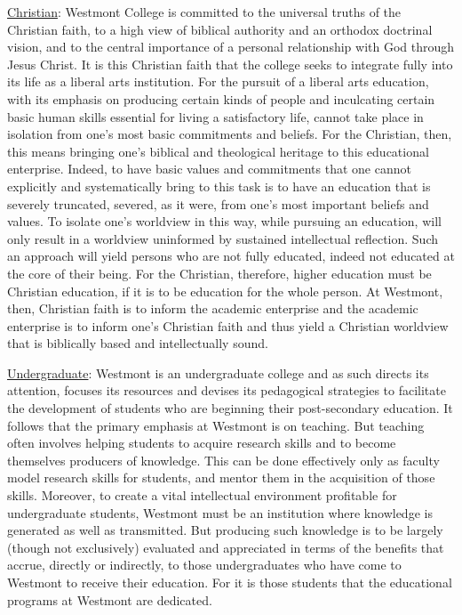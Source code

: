 \underline{Christian}:  Westmont College is committed to the universal truths of the Christian faith, to a high view of biblical authority and an orthodox doctrinal vision, and to the central importance of a personal relationship with God through Jesus Christ.  It is this Christian faith that the college seeks to integrate fully into its life as a liberal arts institution.  For the pursuit of a liberal arts education, with its emphasis on producing certain kinds of people and inculcating certain basic human skills essential for living a satisfactory life, cannot take place in isolation from one's most basic commitments and beliefs.  For the Christian, then, this means bringing one's biblical and theological heritage to this educational enterprise. Indeed, to have basic values and commitments that one cannot explicitly and systematically bring to this task is to have an education that is severely truncated, severed, as it were, from one's most important beliefs and values.  To isolate one's worldview in this way, while pursuing an education, will only result in a worldview uninformed by sustained intellectual reflection.  Such an approach will yield persons who are not fully educated, indeed not educated at the core of their being.  For the Christian, therefore, higher education must be Christian education, if it is to be education for the whole person.  At Westmont, then, Christian faith is to inform the academic enterprise and the academic enterprise is to inform one's Christian faith and thus yield a Christian worldview that is biblically based and intellectually sound. 

 \underline{Undergraduate}:  Westmont is an undergraduate college and as such directs its attention, focuses its resources and devises its pedagogical strategies to facilitate the development of students who are beginning their post-secondary education.  It follows that the primary emphasis at Westmont is on teaching.  But teaching often involves helping students to acquire research skills and to become themselves producers of knowledge.  This can be done effectively only as faculty model research skills for students, and mentor them in the acquisition of those skills.  Moreover, to create a vital intellectual environment profitable for undergraduate students, Westmont must be an institution where knowledge is generated as well as transmitted.  But producing such knowledge is to be largely (though not exclusively) evaluated and appreciated in terms of the benefits that accrue, directly or indirectly, to those undergraduates who have come to Westmont to receive their education. For it is those students that the educational programs at Westmont are dedicated.
 
